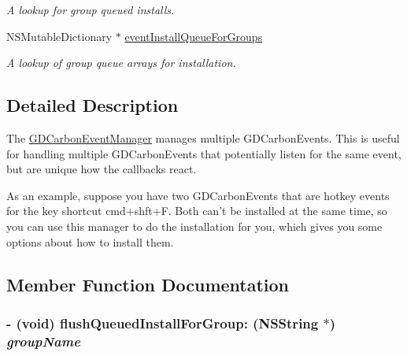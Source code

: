 \begin{DoxyCompactItemize}
\begin{DoxyCompactList}\small\item\em A lookup for group queued installs. \item\end{DoxyCompactList}\item 
\hypertarget{interface_g_d_carbon_event_manager_a46b6eb173c9eaf13f9f64af8bce78d5b}{
NSMutableDictionary $\ast$ \hyperlink{interface_g_d_carbon_event_manager_a46b6eb173c9eaf13f9f64af8bce78d5b}{eventInstallQueueForGroups}}
\label{interface_g_d_carbon_event_manager_a46b6eb173c9eaf13f9f64af8bce78d5b}

\begin{DoxyCompactList}\small\item\em A lookup of group queue arrays for installation. \item\end{DoxyCompactList}\end{DoxyCompactItemize}


\subsection{Detailed Description}
The \hyperlink{interface_g_d_carbon_event_manager}{GDCarbonEventManager} manages multiple GDCarbonEvents. This is useful for handling multiple GDCarbonEvents that potentially listen for the same event, but are unique how the callbacks react.

As an example, suppose you have two GDCarbonEvents that are hotkey events for the key shortcut cmd+shft+F. Both can't be installed at the same time, so you can use this manager to do the installation for you, which gives you some options about how to install them. 

\subsection{Member Function Documentation}
\hypertarget{interface_g_d_carbon_event_manager_a88f2451e02706edb8034b946d6bc25be}{
\subsubsection[{flushQueuedInstallForGroup:}]{\setlength{\rightskip}{0pt plus 5cm}-\/ (void) flushQueuedInstallForGroup: (NSString $\ast$) {\em groupName}}}
\label{interface_g_d_carbon_event_manager_a88f2451e02706edb8034b946d6bc25be}


